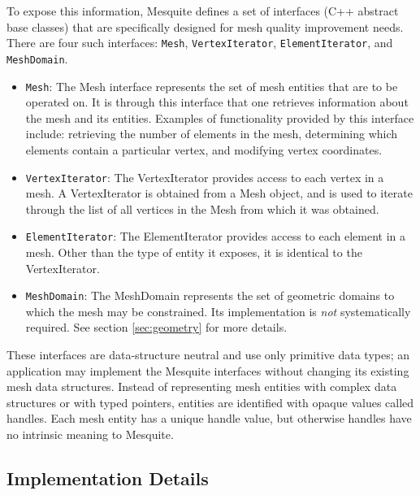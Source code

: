 \documentclass[letter]{report}
\begin{document}
To expose this information, Mesquite defines a set of interfaces 
(C++ abstract base classes) that are specifically designed for mesh
quality improvement needs.  There are four such interfaces: \texttt{Mesh},
\texttt{VertexIterator}, \texttt{ElementIterator}, and \texttt{MeshDomain}.
\begin{itemize}
\item \texttt{Mesh}: The Mesh interface represents the set of mesh
entities that are to be operated on.  It is through this interface
that one retrieves information about the mesh and its entities.
Examples of functionality provided by this interface include:
retrieving the number of elements in the mesh, determining which
elements contain a particular vertex, and modifying vertex
coordinates.
\item \texttt{VertexIterator}: The VertexIterator provides access to each
vertex in a mesh.  A VertexIterator is obtained from a Mesh object,
and is used to iterate through the list of all vertices in the Mesh
from which it was obtained.
\item \texttt{ElementIterator}: The ElementIterator provides access to
each element in a mesh.  Other than the type of entity it exposes, it
is identical to the VertexIterator.
\item \texttt{MeshDomain}: The MeshDomain represents the set of geometric
domains to which the mesh may be constrained. Its implementation is \emph{not} systematically 
required. See section \ref{sec:geometry} for more details. 
\end{itemize}
These interfaces are data-structure neutral and use only primitive
data types; an application may implement the Mesquite interfaces
without changing its existing mesh data structures.  Instead of
representing mesh entities with complex data structures or with typed
pointers, entities are identified with opaque values called handles.
Each mesh entity has a unique handle value, but otherwise handles have
no intrinsic meaning to Mesquite.  

\subsection{Implementation Details}
\end{document}
